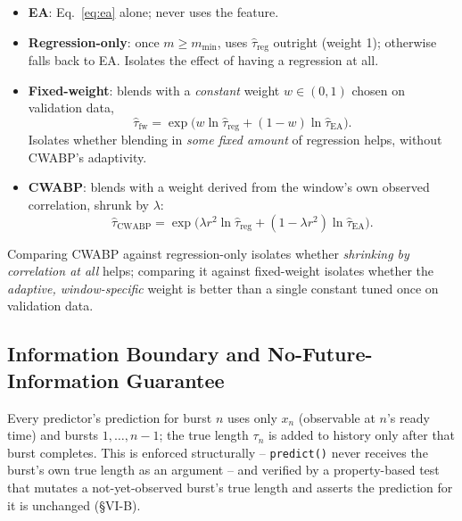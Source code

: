 \documentclass[10pt,twocolumn]{article}
\begin{document}
\begin{itemize}[leftmargin=1.1em,itemsep=1pt,topsep=2pt]
\item \textbf{EA}: Eq.~\ref{eq:ea} alone; never uses the feature.
\item \textbf{Regression-only}: once $m\geq m_{\min}$, uses $\hat\tau_{\mathrm{reg}}$ outright (weight 1); otherwise falls back to EA. Isolates the effect of having a regression at all.
\item \textbf{Fixed-weight}: blends with a \emph{constant} weight $w\in(0,1)$ chosen on validation data,
\begin{equation}
\hat\tau_{\mathrm{fw}} = \exp\!\big(w\ln\hat\tau_{\mathrm{reg}}+(1-w)\ln\hat\tau_{\mathrm{EA}}\big).
\label{eq:fixedweight}
\end{equation}
Isolates whether blending in \emph{some fixed amount} of regression helps, without CWABP's adaptivity.
\item \textbf{CWABP}: blends with a weight derived from the window's own observed correlation, shrunk by $\lambda$:
\begin{equation}
\hat\tau_{\mathrm{CWABP}} = \exp\!\big(\lambda r^2\ln\hat\tau_{\mathrm{reg}}+(1-\lambda r^2)\ln\hat\tau_{\mathrm{EA}}\big).
\label{eq:cwabp}
\end{equation}
\end{itemize}
Comparing CWABP against regression-only isolates whether \emph{shrinking by correlation at all} helps; comparing it against fixed-weight isolates whether the \emph{adaptive, window-specific} weight is better than a single constant tuned once on validation data.

\subsection{Information Boundary and No-Future-Information Guarantee}
Every predictor's prediction for burst $n$ uses only $x_n$ (observable at $n$'s ready time) and bursts $1,\ldots,n-1$; the true length $\tau_n$ is added to history only after that burst completes. This is enforced structurally -- \texttt{predict()} never receives the burst's own true length as an argument -- and verified by a property-based test that mutates a not-yet-observed burst's true length and asserts the prediction for it is unchanged (\S VI-B).
\end{document}
